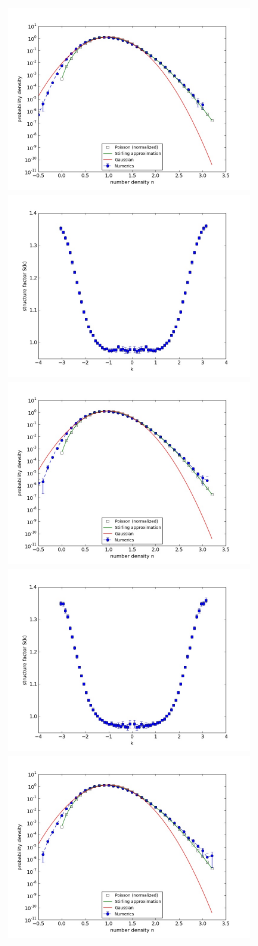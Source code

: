 \documentclass{article}
\begin{document}
\begin{figure}
\begin{center}
\end{center}
\includegraphics[width=0.5\linewidth,height=1.9in]{fig1/appendix_exp_react_dt0.25_hist_mid1.jpg}
\includegraphics[width=0.5\linewidth,height=1.9in]{fig1/appendix_exp_react_dt0.25_Sk_mid1.jpg}
\includegraphics[width=0.5\linewidth,height=1.9in]{fig1/appendix_exp_react_dt0.25_hist_mid2.jpg}
\includegraphics[width=0.5\linewidth,height=1.9in]{fig1/appendix_exp_react_dt0.25_Sk_mid2.jpg}
\includegraphics[width=0.5\linewidth,height=1.9in]{fig1/appendix_exp_react_dt0.25_hist_mid3.jpg}

\end{figure}
\end{document}
